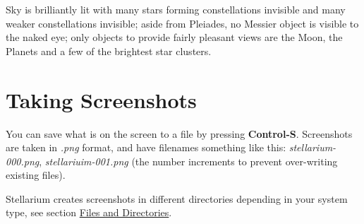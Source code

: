 Sky is brilliantly lit with many stars forming constellations invisible and many weaker
constellations invisible; aside from Pleiades, no Messier object is visible to the naked eye; only objects to provide fairly pleasant views are the Moon, the Planets and a few of the brightest star clusters.

\chapter{Taking Screenshots}\label{taking-screenshots}

You can save what is on the screen to a file by pressing
\textbf{Control-S}. Screenshots are taken in \emph{.png} format, and
have filenames something like this: \emph{stellarium-000.png},
\emph{stellariuim-001.png} (the number increments to prevent
over-writing existing files).

Stellarium creates screenshots in different directories depending in
your system type, see section
\href{Advanced_Use\#Files_and_Directories}{Files and Directories}.




